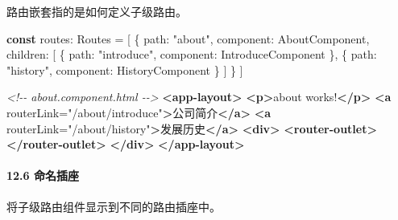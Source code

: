 \documentclass[
]{article}
\newenvironment{Shaded}{}{}
\newcommand{\CommentTok}[1]{\textcolor[rgb]{0.38,0.63,0.69}{\textit{#1}}}
\newcommand{\DataTypeTok}[1]{\textcolor[rgb]{0.56,0.13,0.00}{#1}}
\newcommand{\KeywordTok}[1]{\textcolor[rgb]{0.00,0.44,0.13}{\textbf{#1}}}
\newcommand{\NormalTok}[1]{#1}
\newcommand{\OperatorTok}[1]{\textcolor[rgb]{0.40,0.40,0.40}{#1}}
\newcommand{\OtherTok}[1]{\textcolor[rgb]{0.00,0.44,0.13}{#1}}
\newcommand{\StringTok}[1]{\textcolor[rgb]{0.25,0.44,0.63}{#1}}
\begin{document}
路由嵌套指的是如何定义子级路由。

\begin{Shaded}
\begin{Highlighting}[]
\KeywordTok{const}\NormalTok{ routes}\OperatorTok{:}\NormalTok{ Routes }\OperatorTok{=}\NormalTok{ [}
\NormalTok{  \{}
    \DataTypeTok{path}\OperatorTok{:} \StringTok{"about"}\OperatorTok{,}
    \DataTypeTok{component}\OperatorTok{:}\NormalTok{ AboutComponent}\OperatorTok{,}
    \DataTypeTok{children}\OperatorTok{:}\NormalTok{ [}
\NormalTok{      \{}
        \DataTypeTok{path}\OperatorTok{:} \StringTok{"introduce"}\OperatorTok{,}
        \DataTypeTok{component}\OperatorTok{:}\NormalTok{ IntroduceComponent}
\NormalTok{      \}}\OperatorTok{,}
\NormalTok{      \{}
        \DataTypeTok{path}\OperatorTok{:} \StringTok{"history"}\OperatorTok{,}
        \DataTypeTok{component}\OperatorTok{:}\NormalTok{ HistoryComponent}
\NormalTok{      \}}
\NormalTok{    ]}
\NormalTok{  \}}
\NormalTok{]}
\end{Highlighting}
\end{Shaded}

\begin{Shaded}
\begin{Highlighting}[]
\CommentTok{\textless{}!{-}{-} about.component.html {-}{-}\textgreater{}}
\KeywordTok{\textless{}app{-}layout\textgreater{}}
  \KeywordTok{\textless{}p\textgreater{}}\NormalTok{about works!}\KeywordTok{\textless{}/p\textgreater{}}
  \KeywordTok{\textless{}a}\OtherTok{ routerLink=}\StringTok{"/about/introduce"}\KeywordTok{\textgreater{}}\NormalTok{公司简介}\KeywordTok{\textless{}/a\textgreater{}}
  \KeywordTok{\textless{}a}\OtherTok{ routerLink=}\StringTok{"/about/history"}\KeywordTok{\textgreater{}}\NormalTok{发展历史}\KeywordTok{\textless{}/a\textgreater{}}
  \KeywordTok{\textless{}div\textgreater{}}
    \KeywordTok{\textless{}router{-}outlet\textgreater{}\textless{}/router{-}outlet\textgreater{}}
  \KeywordTok{\textless{}/div\textgreater{}}
\KeywordTok{\textless{}/app{-}layout\textgreater{}}
\end{Highlighting}
\end{Shaded}

\hypertarget{126-ux547dux540dux63d2ux5ea7}{%
\paragraph{12.6 命名插座}\label{126-ux547dux540dux63d2ux5ea7}}

将子级路由组件显示到不同的路由插座中。
\end{document}
